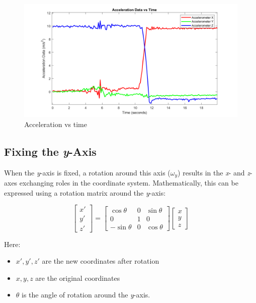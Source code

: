 \documentclass[12pt]{article}
\begin{document}
\begin{figure}[H]
    \centerline{\includegraphics[scale=0.7]{Imagens/accelerationvstime.png}}
    \caption{Acceleration vs time}
    \label{fig}
\end{figure}

\subsection*{Fixing the \textit{y}-Axis}

When the \textit{y}-axis is fixed, a rotation around this axis (\(\omega_y\)) results in the \textit{x}- and \textit{z}-axes exchanging roles in the coordinate system. Mathematically, this can be expressed using a rotation matrix around the \textit{y}-axis:

\[
\begin{bmatrix}
x' \\
y' \\
z'
\end{bmatrix}
=
\begin{bmatrix}
\cos\theta & 0 & \sin\theta \\
0 & 1 & 0 \\
-\sin\theta & 0 & \cos\theta
\end{bmatrix}
\begin{bmatrix}
x \\
y \\
z
\end{bmatrix}
\]

Here:
\begin{itemize}
    \item \(x', y', z'\) are the new coordinates after rotation
    \item \(x, y, z\) are the original coordinates
    \item \(\theta\) is the angle of rotation around the \textit{y}-axis.
\end{itemize}
\end{document}
